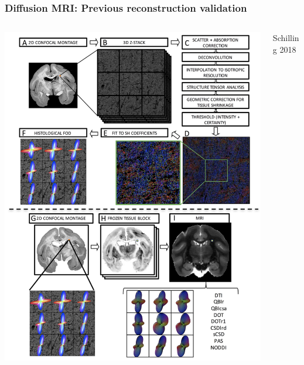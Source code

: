 \documentclass[presentation, 10pt]{beamer}
\begin{document}
\begin{frame}
  \frametitle{Diffusion MRI: Previous reconstruction validation}
  \begin{columns}
    \begin{column}{0.7\textwidth}
      \begin{center}
        \includegraphics[height=0.9\textheight]{figs/schilling}
      \end{center}
    \end{column}
    \begin{column}{0.3\textwidth}
      \centering
      \small{Schilling 2018\cite{Schilling2018}}
    \end{column}    
  \end{columns}
\end{frame}
\end{document}
